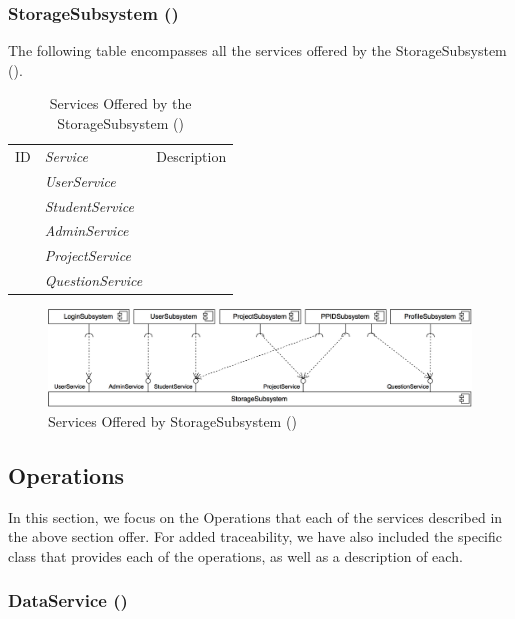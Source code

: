 \documentclass[12pt,letterpaper]{article}
\begin{document}
\subsubsection{StorageSubsystem ()}

The following table encompasses all the services offered by the StorageSubsystem (). 

\begin{table}[H]
	\caption{Services Offered by the StorageSubsystem ()} 
	\begin{tabu} to 
		\tableheader{}ID & Service & Description\\
		 & UserService & \\
		 & StudentService & \\
		 & AdminService & \\
		 & ProjectService & \\
		 & QuestionService & \\
	\end{tabu}
\end{table}

\begin{figure}[H]
	\centering{}
	\includegraphics[scale=0.27]{imgs/d3/services/storage-subsystem.png}
	\caption{Services Offered by StorageSubsystem ()}
\end{figure}

\subsection{Operations}

In this section, we focus on the Operations that each of the services described in the above section offer. For added traceability, we have also included the specific class that provides each of the operations, as well as a description of each.

\subsubsection{DataService ()}
\end{document}
